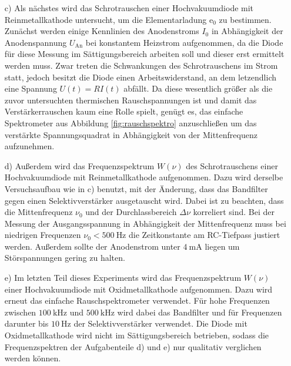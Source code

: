 \begin{enumerate}
  \item[c)] Als nächstes wird das Schrotrauschen einer Hochvakuumdiode mit Reinmetallkathode untersucht,
  um die Elementarladung $\mathrm{e}_0$ zu bestimmen.
  Zunächst werden einige Kennlinien des Anodenstroms $I_0$ in Abhängigkeit der Anodenspannung $U_\text{An}$ bei
  konstantem Heizstrom aufgenommen, da die Diode für diese Messung im Sättigungsbereich arbeiten soll und dieser
  erst ermittelt werden muss. Zwar treten die Schwankungen des Schrotrauschens im Strom statt, jedoch besitzt
  die Diode einen Arbeitswiderstand, an dem letzendlich eine Spannung $U(t) = R I(t)$ abfällt. Da diese wesentlich
  größer als die zuvor untersuchten thermischen Rauschspannungen ist und damit das Verstärkerrauschen kaum eine Rolle spielt,
  genügt es, das einfache Spektrometer aus Abbildung \ref{fig:rauschspektro} anzuschließen um das verstärkte
  Spannungsquadrat in Abhängigkeit von der Mittenfrequenz aufzunehmen.

  \item[d)] Außerdem wird das Frequenzspektrum $W(\nu)$ des Schrotrauschens einer Hochvakuumdiode mit Reinmetallkathode
  aufgenommen. Dazu wird derselbe Versuchsaufbau wie in c) benutzt, mit der Änderung, dass das Bandfilter gegen
  einen Selektivverstärker ausgetauscht wird. Dabei ist zu beachten, dass die Mittenfrequenz $\nu_0$ und der
  Durchlassbereich $\Delta \nu$ korreliert sind.
  Bei der Messung der Ausgangsspannung in Abhängigkeit der Mittenfrequenz muss bei niedrigen Frequenzen
  $\nu_0 < \SI{500}{\hertz}$ die Zeitkonstante am RC-Tiefpass justiert werden. Außerdem sollte der Anodenstrom
  unter $\SI{4}{\milli\ampere}$ liegen um Störspannungen gering zu halten.

  \item[e)] Im letzten Teil dieses Experiments wird das Frequenzspektrum $W(\nu)$ einer Hochvakuumdiode mit Oxidmetallkathode
  aufgenommen. Dazu wird erneut das einfache Rauschspektrometer verwendet. Für hohe Frequenzen zwischen $\SI{100}{\kilo\hertz}$
  und $\SI{500}{\kilo\hertz}$ wird dabei das Bandfilter und für Frequenzen darunter bis $\SI{10}{\hertz}$ der Selektivverstärker
  verwendet. Die Diode mit Oxidmetallkathode wird nicht im Sättigungsbereich betrieben, sodass die Frequenzspektren der
  Aufgabenteile d) und e) nur qualitativ verglichen werden können.
\end{enumerate}
